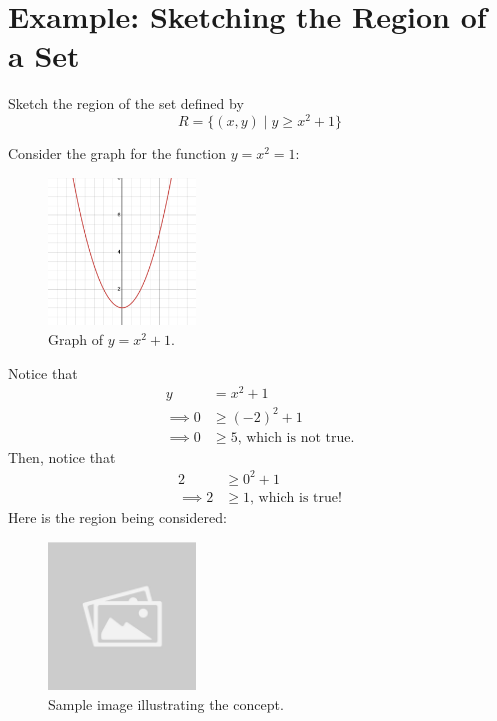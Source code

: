 \documentclass{article}
\begin{document}
\section*{Example: Sketching the Region of a Set}
\begin{examplebox}
Sketch the region of the set defined by
\[
    R = \{ (x, y) \mid y \geq x^2 + 1 \}
\]
\begin{solutionbox}
    Consider the graph for the function \( y = x^2 = 1 \):
    \begin{figure}[H]
        \centering
        \includegraphics[width=0.35\textwidth]{x^2 + 1.png}
        \caption{Graph of \( y = x^2 + 1 \).}
        \label{fig:sample_image}
    \end{figure}
    Notice that
    \begin{equation*}
    \begin{aligned}
    y &= x^2 + 1 \\
    \implies 0 &\geq (-2)^2 + 1 \\
    \implies 0 &\geq 5 \text{, which is not true.}
    \end{aligned}
    \end{equation*}
    Then, notice that
    \begin{equation*}
    \begin{aligned}
    2 &\geq 0^2 + 1 \\
    \implies 2 &\geq 1 \text{, which is true!}
    \end{aligned}
    \end{equation*}
    Here is the region being considered:
    \begin{figure}[H]
        \centering
        \includegraphics[width=0.35\textwidth]{sample_image.jpg}
        \caption{Sample image illustrating the concept.}
        \label{fig:sample_image}
    \end{figure}
\end{solutionbox}
\end{examplebox}
\end{document}
